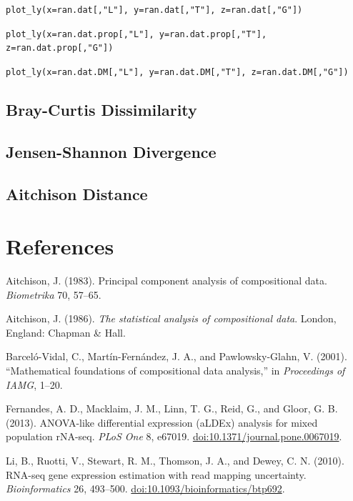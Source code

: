 \documentclass[twocolumn]{article}
\begin{document}
\texttt{plot\_ly(x=ran.dat[,"L"], y=ran.dat[,"T"], z=ran.dat[,"G"])}

\texttt{plot\_ly(x=ran.dat.prop[,"L"], y=ran.dat.prop[,"T"], z=ran.dat.prop[,"G"])}

\texttt{plot\_ly(x=ran.dat.DM[,"L"], y=ran.dat.DM[,"T"], z=ran.dat.DM[,"G"])}

\subsection{Bray-Curtis Dissimilarity}\subsection{Jensen-Shannon Divergence}\subsection{Aitchison Distance}

\clearpage

\section*{References}\label{references}

Aitchison, J. (1983). Principal component analysis of compositional
data. \emph{Biometrika} 70, 57--65.

Aitchison, J. (1986). \emph{The statistical analysis of compositional
data}. London, England: Chapman \& Hall.

Barceló-Vidal, C., Martín-Fernández, J. A., and Pawlowsky-Glahn, V.
(2001). ``Mathematical foundations of compositional data analysis,'' in
\emph{Proceedings of IAMG}, 1--20.

Fernandes, A. D., Macklaim, J. M., Linn, T. G., Reid, G., and Gloor, G.
B. (2013). ANOVA-like differential expression (aLDEx) analysis for mixed
population rNA-seq. \emph{PLoS One} 8, e67019.
\href{http://doi.org/10.1371/journal.pone.0067019}{doi:10.1371/journal.pone.0067019}.

Li, B., Ruotti, V., Stewart, R. M., Thomson, J. A., and Dewey, C. N.
(2010). RNA-seq gene expression estimation with read mapping
uncertainty. \emph{Bioinformatics} 26, 493--500.
\href{http://doi.org/10.1093/bioinformatics/btp692}{doi:10.1093/bioinformatics/btp692}.
\end{document}
